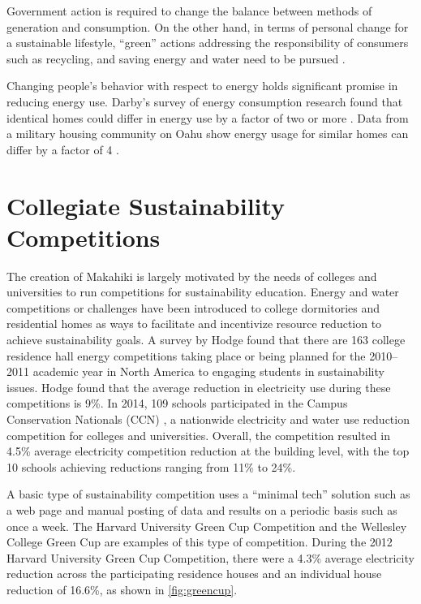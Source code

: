 Government action is required to change the balance between methods of generation and consumption. On the other hand, in terms of personal change for a sustainable lifestyle, ``green'' actions addressing the responsibility of consumers such as recycling, and saving energy and water need to be pursued \cite{kagawa2007dissonance}.  

Changing people's behavior with respect to energy holds significant promise in reducing energy use. Darby's survey of energy consumption research found that identical homes could differ in energy use by a factor of two or more \cite{darby-review-2006}. Data from a military housing community on Oahu show energy usage for similar homes can differ by a factor of 4 \cite{Norton2010ZeroEnergyHomes}.

\section{Collegiate Sustainability Competitions}
\label{sec:rel-competition}

The creation of Makahiki is largely motivated by the needs of colleges and universities to run competitions for sustainability education. Energy and water competitions or challenges have been introduced to college dormitories and residential homes as ways to facilitate and incentivize resource reduction to achieve sustainability goals. A survey by Hodge \cite{Hodge2010} found that there are 163 college residence hall energy competitions taking place or being planned for the 2010--2011 academic year in North America to engaging students in sustainability issues. Hodge found that the average reduction in electricity use during these competitions is 9\%. In 2014, 109 schools participated in the Campus Conservation Nationals (CCN) \cite{competetoreduce}, a nationwide electricity and water use reduction competition for colleges and universities. Overall, the competition resulted in 4.5\% average electricity competition reduction at the building level, with the top 10 schools achieving reductions ranging from 11\% to 24\%. 

A basic type of sustainability competition uses a ``minimal tech'' solution such as a web page and manual posting of data and results on a periodic basis such as once a week. The Harvard University Green Cup Competition \cite{harvard-green-cup} and the Wellesley College Green Cup \cite{wellesley-green-cup} are examples of this type of competition. During the 2012 Harvard University Green Cup Competition, there were a 4.3\% average electricity reduction across the participating residence houses and an individual house reduction of 16.6\%, as shown in \autoref{fig:greencup}.

